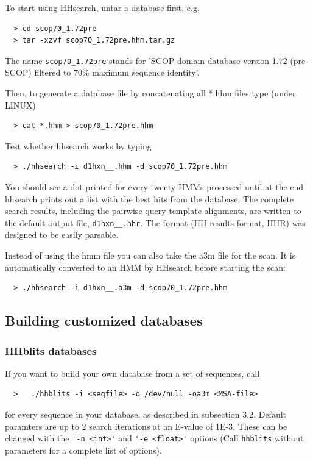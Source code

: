 \documentclass[11pt,a4paper]{article}
\begin{document}
To start using HHsearch, untar a database first, e.g.
\begin{verbatim}
  > cd scop70_1.72pre
  > tar -xzvf scop70_1.72pre.hhm.tar.gz
\end{verbatim}

The name \verb`scop70_1.72pre` stands for 'SCOP domain database version 1.72 (pre-SCOP) 
filtered to 70\% maximum sequence identity'.

Then, to generate a database file by concatenating all *.hhm files type (under LINUX)
\begin{verbatim}
  > cat *.hhm > scop70_1.72pre.hhm
\end{verbatim}

Test whether hhsearch works by typing
\begin{verbatim}
  > ./hhsearch -i d1hxn__.hhm -d scop70_1.72pre.hhm
\end{verbatim}

You should see a dot printed for every twenty HMMs processed until at the end 
hhsearch prints out a list with the best hits from the database. The complete 
search results, including the pairwise query-template alignments, are written to the 
default output file, \verb`d1hxn__.hhr`. The format (HH results format, HHR) was 
designed to be easily parsable.

Instead of using the hmm file you can also take the a3m file for the scan. It is 
automatically converted to an HMM by HHsearch before starting the scan:
\begin{verbatim}
  > ./hhsearch -i d1hxn__.a3m -d scop70_1.72pre.hhm
\end{verbatim}



\subsection{Building customized databases}

\subsubsection{HHblits databases}

If you want to build your own database from a set of sequences, call 
\begin{verbatim}
  >   ./hhblits -i <seqfile> -o /dev/null -oa3m <MSA-file>
\end{verbatim}

for every sequence in your database, as described in subsection 3.2. Default paramters 
are up to 2 search iterations at an E-value of 1E-3. These can be changed with the 
\verb`'-n <int>'` and \verb`'-e <float>'` options (Call \verb`hhblits` without parameters for a 
complete list of options). 
\end{document}
